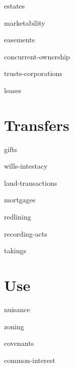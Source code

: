 \documentclass[12pt]{book}
\begin{document}
\module estates

\module marketability

\module easements

\module concurrent-ownership

\module trusts-corporations

\module leases



\part{Transfers}

\module gifts

\module wills-intestacy

\module land-transactions

\module mortgages

\module redlining

\module recording-acts

\module takings


\part{Use}

\module nuisance

\module zoning

\module covenants

\module common-interest
\end{document}
